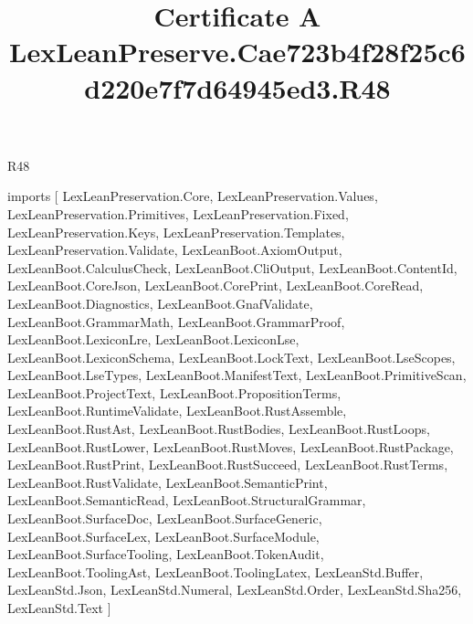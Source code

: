 \begin{lexlean}{R48}
\title{Certificate A LexLeanPreserve.Cae723b4f28f25c6d220e7f7d64945ed3.R48}
\begin{coremodule}
imports [
  LexLeanPreservation.Core,
  LexLeanPreservation.Values,
  LexLeanPreservation.Primitives,
  LexLeanPreservation.Fixed,
  LexLeanPreservation.Keys,
  LexLeanPreservation.Templates,
  LexLeanPreservation.Validate,
  LexLeanBoot.AxiomOutput,
  LexLeanBoot.CalculusCheck,
  LexLeanBoot.CliOutput,
  LexLeanBoot.ContentId,
  LexLeanBoot.CoreJson,
  LexLeanBoot.CorePrint,
  LexLeanBoot.CoreRead,
  LexLeanBoot.Diagnostics,
  LexLeanBoot.GnafValidate,
  LexLeanBoot.GrammarMath,
  LexLeanBoot.GrammarProof,
  LexLeanBoot.LexiconLre,
  LexLeanBoot.LexiconLse,
  LexLeanBoot.LexiconSchema,
  LexLeanBoot.LockText,
  LexLeanBoot.LseScopes,
  LexLeanBoot.LseTypes,
  LexLeanBoot.ManifestText,
  LexLeanBoot.PrimitiveScan,
  LexLeanBoot.ProjectText,
  LexLeanBoot.PropositionTerms,
  LexLeanBoot.RuntimeValidate,
  LexLeanBoot.RustAssemble,
  LexLeanBoot.RustAst,
  LexLeanBoot.RustBodies,
  LexLeanBoot.RustLoops,
  LexLeanBoot.RustLower,
  LexLeanBoot.RustMoves,
  LexLeanBoot.RustPackage,
  LexLeanBoot.RustPrint,
  LexLeanBoot.RustSucceed,
  LexLeanBoot.RustTerms,
  LexLeanBoot.RustValidate,
  LexLeanBoot.SemanticPrint,
  LexLeanBoot.SemanticRead,
  LexLeanBoot.StructuralGrammar,
  LexLeanBoot.SurfaceDoc,
  LexLeanBoot.SurfaceGeneric,
  LexLeanBoot.SurfaceLex,
  LexLeanBoot.SurfaceModule,
  LexLeanBoot.SurfaceTooling,
  LexLeanBoot.TokenAudit,
  LexLeanBoot.ToolingAst,
  LexLeanBoot.ToolingLatex,
  LexLeanStd.Buffer,
  LexLeanStd.Json,
  LexLeanStd.Numeral,
  LexLeanStd.Order,
  LexLeanStd.Sha256,
  LexLeanStd.Text
]


\end{coremodule}
\end{lexlean}
